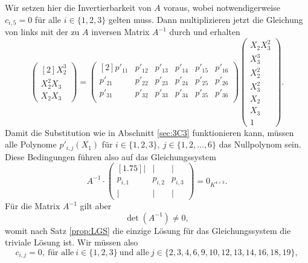 \documentclass[a4paper,oneside, 11pt, openany%
]{article}
\theoremstyle{custom}
\theoremstyle{custom}
\begin{document}
	Wir setzen hier die Invertierbarkeit von $A$  voraus, wobei notwendigerweise $c_{i,5}=0$ für alle $i \in \{1,2,3\}$  gelten muss. Dann multiplizieren jetzt die Gleichung von links mit der zu $A$ inversen Matrix $A^{-1}$ durch und erhalten
	\begin{equation*}
		\begin{pmatrix}[2]
			X_{2}^3\\
			X_{2}^2X_{3}\\
			X_{2}X_{3}
		\end{pmatrix}
		=
		\begin{pmatrix}[2]
			p'_{11}&p'_{12}& p'_{13}& p'_{14}& p'_{15}& p'_{16}\\
			p'_{21}&p'_{22}& p'_{23}& p'_{24}& p'_{25}& p'_{26}\\
			p'_{31}&p'_{32}& p'_{33}& p'_{34}& p'_{35}& p'_{36}\\
		\end{pmatrix}
		\begin{pmatrix}
			X_{2}X_{3}^2\\
			X_{3}^3\\
			X_{2}^2\\
			X_{3}^2\\
			X_{2}\\
			X_{3}\\
			1
		\end{pmatrix}.
	\end{equation*}
	Damit die Substitution wie in Abschnitt \ref{sec:3C3} funktionieren kann, müssen alle Polynome
	$p'_{i,j}(X_{1})$ für $i \in \{1,2,3\}, \ j \in \{1,2,\dots,6\}$ das Nullpolynom sein.
	Diese Bedingungen führen also auf das Gleichungssystem
	\begin{equation}
		A^{-1} \cdot \begin{pmatrix}[1.75]
			\vert & \vert & \vert \\
			p_{i,1}&p_{i,2}& p_{i,3}\\
			\vert & \vert & \vert
		\end{pmatrix}
		= 0_{K^{4 \times 3}}.
	\end{equation}
	Für die Matrix $A^{-1}$ gilt aber \begin{equation*}
		\det{\left(A^{-1}\right)} \neq 0,
	\end{equation*} womit nach Satz \ref{prop:LGS} die einzige Lösung für das Gleichungssystem die triviale Lösung ist.
	Wir müssen also
	\begin{equation*}
		c_{i,j} = 0 , \ \text{für alle} \ i \in \{1,2,3\} \ \text{und alle} \ j \in \{2,3,4,6,9,10,12,13,14,16,18,19\},
	\end{equation*}
\end{document}
